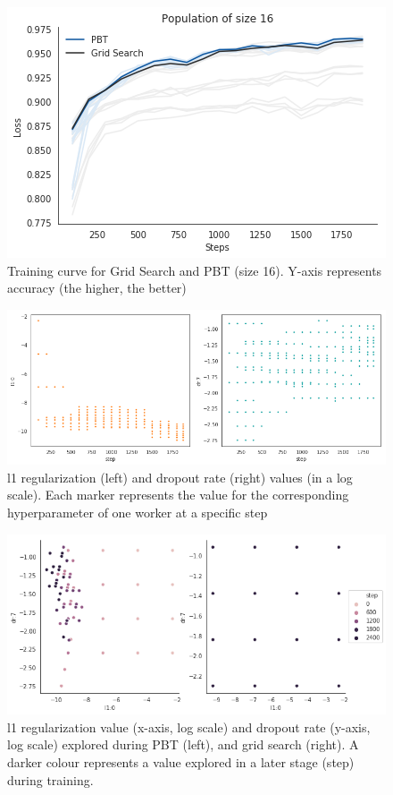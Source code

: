 \documentclass{article}
\begin{document}
\begin{figure}[H]
    \label{fig:training-curves3}
    \centering
    \includegraphics[scale=0.65]{training_curves3}
    \caption{Training curve for Grid Search and PBT (size 16). Y-axis represents accuracy (the higher, the better)}
\end{figure}

\begin{figure}[H]
    \label{fig:hyp3}
    \centering
    \includegraphics[width=\textwidth,height=\textheight,keepaspectratio]{hyperparameters_population3.png}
    \caption{l1 regularization (left) and dropout rate (right) values (in a log scale). Each marker represents the value for the corresponding hyperparameter of one worker at a specific step}
\end{figure}

\begin{figure}[H]
    \label{fig:evol3}
    \centering
    \includegraphics[width=\textwidth,height=\textheight,keepaspectratio]{hyperparameters_evolution3.png}
    \caption{l1 regularization value (x-axis, log scale) and dropout rate (y-axis, log scale) explored during PBT (left), and grid search (right). A darker colour represents a value explored in a later stage (step) during training.}
\end{figure}
\end{document}
